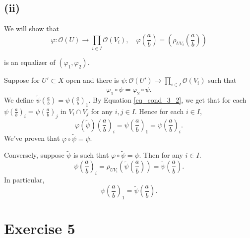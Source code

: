 \documentclass{article}
\begin{document}
\subsection*{(ii)}

We will show that 
\begin{equation*}
\varphi:\mathcal{O}(U)\to\prod_{i\in I} \mathcal{O}(V_i), \quad\varphi\left({\frac a b}\right) = \left(\rho_{UV_i}\left({\frac a b}\right)\right)
\end{equation*}

is an equalizer of $(\varphi_1,\varphi_2)$.\\
\par Suppose for $ U'\subset X$ open and there is $\psi:\mathcal{O}(U')\to\prod_{i\in I}\mathcal{O}(V_i)$ such that 
\begin{equation}
\label{eq_cond_3_2}
\varphi_1\circ\psi = \varphi_2\circ\psi.
\end{equation}
We define $\tilde{\psi}\left({\frac a b}\right)=\psi\left({\frac a b}\right)_1$. By Equation \ref{eq_cond_3_2}, we get that for each $\psi\left({\frac a b}\right)_i=\psi\left({\frac a b}\right)_j$ in $V_i\cap V_j$ for any $i,j\in I$. Hence for each $i\in I$,
\begin{equation}
\varphi(\tilde{\psi})\left({\frac a b}\right)_i = \psi\left({\frac a b}\right)_1 =  \psi\left({\frac a b}\right)_i.
\end{equation}
We've proven that $\varphi\circ\tilde{\psi} = \psi$.\\
\par Conversely, suppose $\tilde{\psi}$ is such that $\varphi\circ\tilde{\psi} = \psi$. Then for any $i\in I$.
\begin{equation*}
\psi\left({\frac a b}\right)_i=\rho_{UV_i}\left(\tilde{\psi}\left({\frac a b}\right)\right)=\tilde{\psi}\left({\frac a b}\right).
\end{equation*}
In particular,
\begin{equation*}
\psi\left({\frac a b}\right)_1=\tilde{\psi}\left({\frac a b}\right).
\end{equation*}
\section{Exercise 5}
\end{document}
